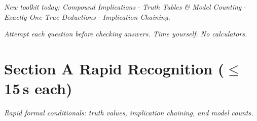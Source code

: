 \documentclass[11pt,a4paper]{article}
\begin{document}
\noindent\textit{New toolkit today: Compound Implications $\cdot$ Truth Tables \& Model Counting $\cdot$ Exactly-One-True Deductions $\cdot$ Implication Chaining.}

\vspace{2pt}
\noindent\textit{Attempt each question before checking answers. Time yourself. No calculators.}

\section*{Section A \quad Rapid Recognition \hfill{\normalfont\small($\leq$15\,s each)}}

\noindent\textit{Rapid formal conditionals: truth values, implication chaining, and model counts.}
\end{document}
